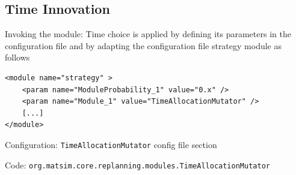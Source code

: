 %



\subsection{Time Innovation}
\label{sec:timechoice}
\begin{compactitem}
\item Invoking the module: Time choice is applied by defining its parameters in the configuration file and by adapting the configuration file strategy module as follows
%
\begin{lstlisting}
<module name="strategy" >
    <param name="ModuleProbability_1" value="0.x" />
    <param name="Module_1" value="TimeAllocationMutator" />
    [...]
</module>
\end{lstlisting}
%
\item Configuration: \lstinline|TimeAllocationMutator| config file section
\item Code: \lstinline|org.matsim.core.replanning.modules.TimeAllocationMutator|
\end{compactitem}


